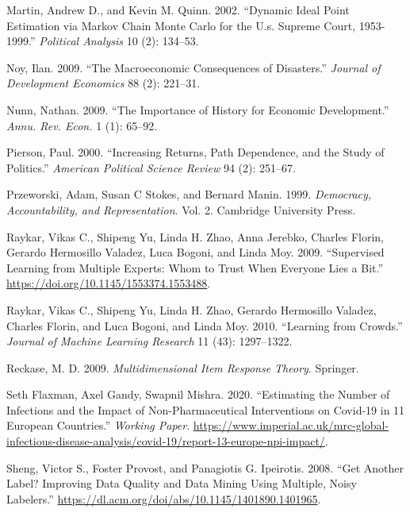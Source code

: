 \documentclass[]{article}
\begin{document}
\leavevmode\hypertarget{ref-quinn2002}{}%
Martin, Andrew D., and Kevin M. Quinn. 2002. ``Dynamic Ideal Point Estimation via Markov Chain Monte Carlo for the U.s. Supreme Court, 1953-1999.'' \emph{Political Analysis} 10 (2): 134--53.

\leavevmode\hypertarget{ref-noy2009macroeconomic}{}%
Noy, Ilan. 2009. ``The Macroeconomic Consequences of Disasters.'' \emph{Journal of Development Economics} 88 (2): 221--31.

\leavevmode\hypertarget{ref-nunn2009importance}{}%
Nunn, Nathan. 2009. ``The Importance of History for Economic Development.'' \emph{Annu. Rev. Econ.} 1 (1): 65--92.

\leavevmode\hypertarget{ref-pierson2000increasing}{}%
Pierson, Paul. 2000. ``Increasing Returns, Path Dependence, and the Study of Politics.'' \emph{American Political Science Review} 94 (2): 251--67.

\leavevmode\hypertarget{ref-przeworski1999democracy}{}%
Przeworski, Adam, Susan C Stokes, and Bernard Manin. 1999. \emph{Democracy, Accountability, and Representation}. Vol. 2. Cambridge University Press.

\leavevmode\hypertarget{ref-Raykar2009}{}%
Raykar, Vikas C., Shipeng Yu, Linda H. Zhao, Anna Jerebko, Charles Florin, Gerardo Hermosillo Valadez, Luca Bogoni, and Linda Moy. 2009. ``Supervised Learning from Multiple Experts: Whom to Trust When Everyone Lies a Bit.'' \url{https://doi.org/10.1145/1553374.1553488}.

\leavevmode\hypertarget{ref-Raykar2010}{}%
Raykar, Vikas C., Shipeng Yu, Linda H. Zhao, Gerardo Hermosillo Valadez, Charles Florin, and Luca Bogoni, and Linda Moy. 2010. ``Learning from Crowds.'' \emph{Journal of Machine Learning Research} 11 (43): 1297--1322.

\leavevmode\hypertarget{ref-reckase2009}{}%
Reckase, M. D. 2009. \emph{Multidimensional Item Response Theory}. Springer.

\leavevmode\hypertarget{ref-flaxman2020}{}%
Seth Flaxman, Axel Gandy, Swapnil Mishra. 2020. ``Estimating the Number of Infections and the Impact of Non-Pharmaceutical Interventions on Covid-19 in 11 European Countries.'' \emph{Working Paper}. \url{https://www.imperial.ac.uk/mrc-global-infectious-disease-analysis/covid-19/report-13-europe-npi-impact/}.

\leavevmode\hypertarget{ref-Sheng2008}{}%
Sheng, Victor S., Foster Provost, and Panagiotis G. Ipeirotis. 2008. ``Get Another Label? Improving Data Quality and Data Mining Using Multiple, Noisy Labelers.'' \url{https://dl.acm.org/doi/abs/10.1145/1401890.1401965}.
\end{document}
